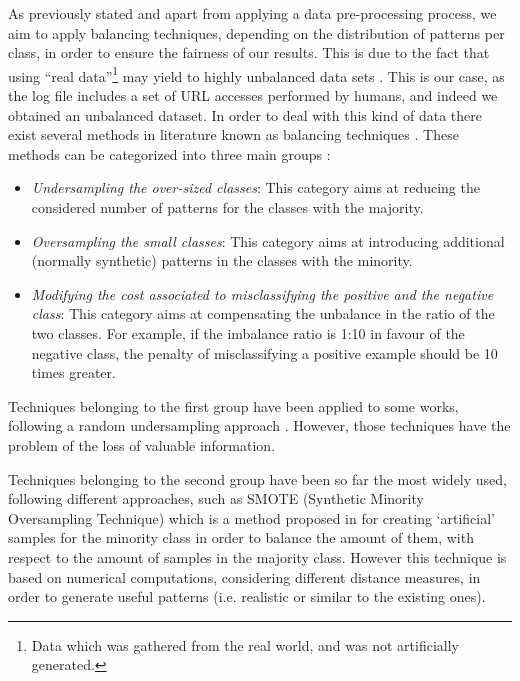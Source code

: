 \documentclass{llncs}
\begin{document}
As previously stated and apart from applying a data pre-processing
process, we aim to apply balancing techniques, depending on the
distribution of patterns per class, in order to ensure the fairness of
our results. This is due to the fact that using ``real
data''\footnote{Data which was gathered from the real world, and was
  not artificially generated.} may yield to highly unbalanced data
sets \cite{imbalanced_data_05}. This is our case, as the log file
includes a set of URL accesses performed by humans, and indeed we
obtained an unbalanced dataset. In order to deal with this kind of
data there exist several methods in literature known as balancing
techniques \cite{imbalanced_data_05}. These methods can be categorized
into three main groups \cite{imbalance_techniques_02}:

\begin{itemize}
\item \textit{Undersampling the over-sized classes}: This category aims at reducing the considered number of patterns for the classes with the majority.
\item \textit{Oversampling the small classes}: This category aims at introducing additional (normally synthetic) patterns in the classes with the minority.
\item \textit{Modifying the cost associated to misclassifying the positive and the negative class}: This category aims at compensating the unbalance in the ratio of the two classes. For example, if the imbalance ratio is 1:10 in favour of the negative class, the penalty of misclassifying a positive example should be 10 times greater.
\end{itemize}

Techniques belonging to the first group have been applied to some works, following a random undersampling approach \cite{random_undersampling_08}. However, those techniques have the problem of the loss of valuable information.

Techniques belonging to the second  group have been so far the most widely used, following different approaches, such as SMOTE (Synthetic Minority Oversampling Technique)  which is a method proposed in \cite{smote_02} for creating `artificial' samples for the minority class in order to balance the amount of them, with respect to the amount of samples in the majority class. However this technique is based on numerical computations, considering  different distance measures, in order to generate useful patterns  (i.e. realistic or similar to the existing ones).
\end{document}
